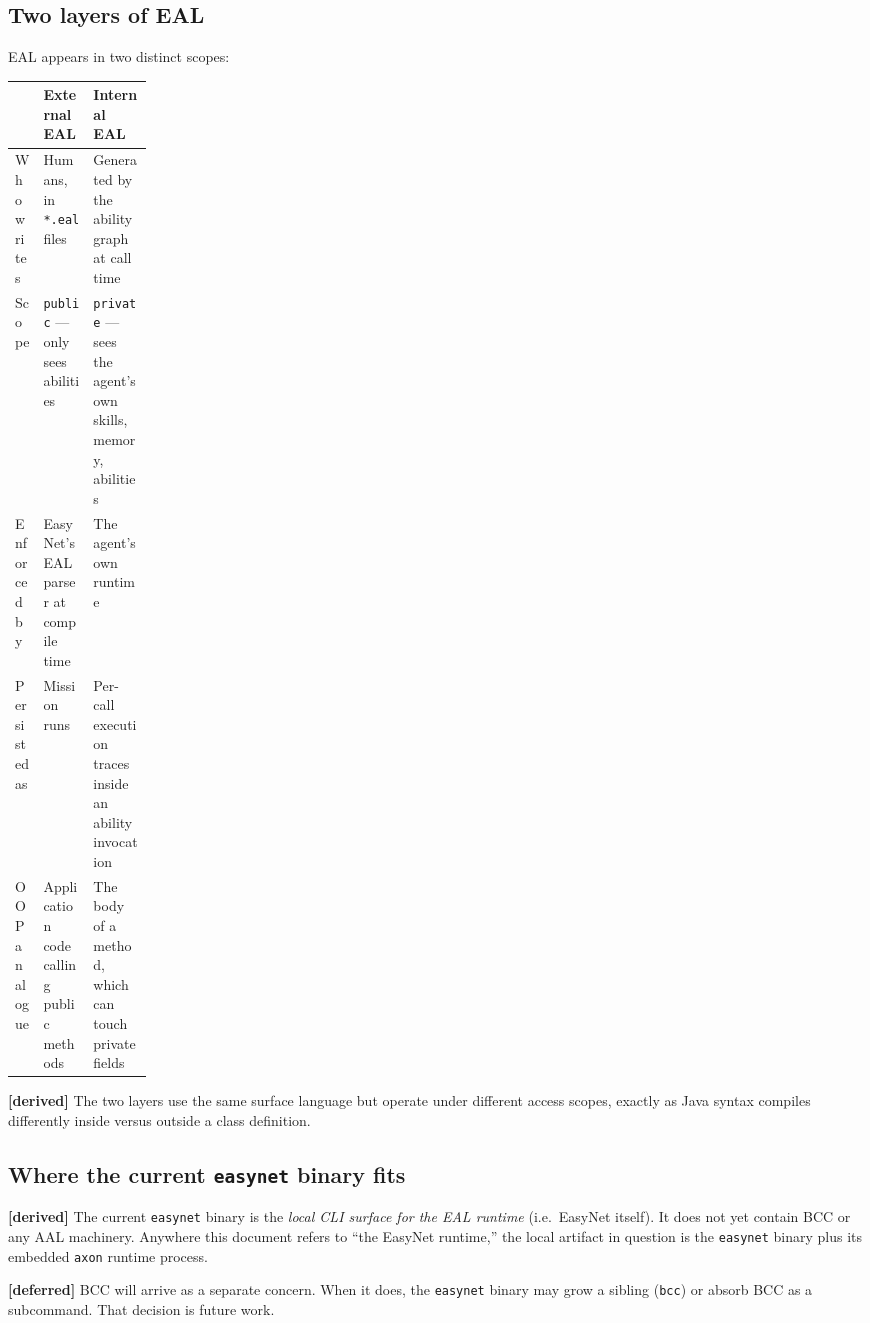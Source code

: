 \documentclass[11pt,a4paper]{article}
\newcommand{\derived}{\textcolor{derivedcolor}{\textbf{[derived]}}\xspace}
\newcommand{\deferred}{\textcolor{deferredcolor}{\textbf{[deferred]}}\xspace}
\begin{document}
\subsection{Two layers of EAL}
\label{sec:two-eal-layers}

EAL appears in two distinct scopes:

\begin{center}
\renewcommand{\arraystretch}{1.25}
\begin{tabularx}{\linewidth}{L{0.16\linewidth} X X}
\toprule
 & \textbf{External EAL} & \textbf{Internal EAL} \\
\midrule
Who writes & Humans, in \texttt{*.eal} files & Generated by the ability graph
at call time \\
Scope & \texttt{public} --- only sees abilities & \texttt{private} --- sees
the agent's own skills, memory, abilities \\
Enforced by & EasyNet's EAL parser at compile time & The agent's own runtime \\
Persisted as & Mission runs & Per-call execution traces inside an ability
invocation \\
OOP analogue & Application code calling public methods & The body of a
method, which can touch private fields \\
\bottomrule
\end{tabularx}
\end{center}

\derived{} The two layers use the same surface language but operate under
different access scopes, exactly as Java syntax compiles differently inside
versus outside a class definition.

\subsection{Where the current \texttt{easynet} binary fits}

\derived{} The current \texttt{easynet} binary is the \emph{local CLI surface
for the EAL runtime} (i.e.\ EasyNet itself). It does not yet contain BCC or
any AAL machinery. Anywhere this document refers to ``the EasyNet runtime,''
the local artifact in question is the \texttt{easynet} binary plus its
embedded \texttt{axon} runtime process.

\deferred{} BCC will arrive as a separate concern. When it does, the
\texttt{easynet} binary may grow a sibling (\texttt{bcc}) or absorb BCC as a
subcommand. That decision is future work.

\end{document}

